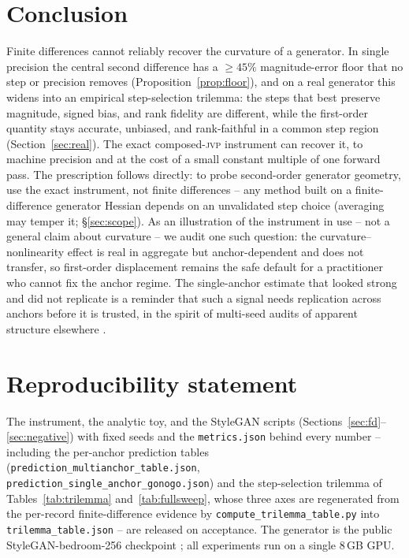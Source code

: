 \documentclass[10pt]{article}
\newcommand{\jvp}{\textsc{jvp}}
\begin{document}
\section{Conclusion}
Finite differences cannot reliably recover the curvature of a generator. In single precision the central
second difference has a $\geq45\%$ magnitude-error floor that no step or precision removes
(Proposition~\ref{prop:floor}), and on a real generator this widens into an empirical step-selection
trilemma: the steps that best preserve magnitude, signed bias, and rank fidelity are different, while the
first-order quantity stays accurate, unbiased, and rank-faithful in a common step region
(Section~\ref{sec:real}). The exact composed-\jvp{} instrument can recover
it, to machine precision and at the cost of a small constant multiple of one forward pass. The
prescription follows directly: to probe second-order generator geometry, use the exact instrument, not
finite differences -- any method built on a finite-difference generator Hessian depends on an
unvalidated step choice (averaging may temper it; \S\ref{sec:scope}). As an
illustration of the instrument in use -- not a general claim about curvature -- we audit one such
question: the curvature--nonlinearity effect is real in aggregate but anchor-dependent and does not
transfer, so first-order displacement remains the safe default for a practitioner who cannot fix the
anchor regime.
The single-anchor estimate that looked strong and did not replicate is a reminder that such a signal
needs replication across anchors before it is trusted, in the spirit of multi-seed audits of
apparent structure elsewhere \citep{locatello2019,hewitt2019}.

\section*{Reproducibility statement}
The instrument, the analytic toy, and the StyleGAN scripts (Sections~\ref{sec:fd}--\ref{sec:negative})
with fixed seeds and the \texttt{metrics.json} behind every number -- including the per-anchor prediction
tables (\texttt{prediction\_multianchor\_table.json}, \texttt{prediction\_single\_anchor\_gonogo.json})
and the step-selection trilemma of Tables~\ref{tab:trilemma} and~\ref{tab:fullsweep}, whose three axes
are regenerated from the per-record finite-difference evidence by \texttt{compute\_trilemma\_table.py}
into \texttt{trilemma\_table.json} -- are released on acceptance. The
generator is the public StyleGAN-bedroom-256 checkpoint \citep{karras2019}; all experiments run on a
single 8\,GB GPU.
\end{document}
